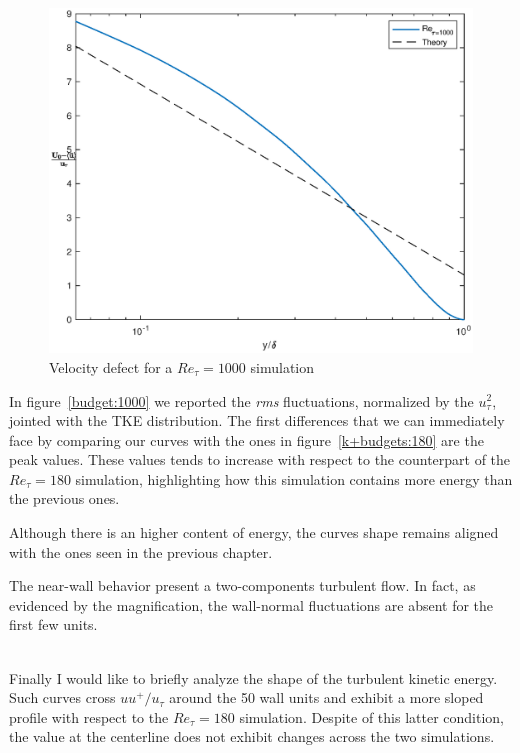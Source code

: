 \begin{figure}
\begin{center}
\includegraphics[scale=0.55]{grafici/velocity_defect_1000.eps}
\caption{Velocity defect for a $Re_{\tau}=1000$ simulation}
\label{velocity:defect:1000}
\end{center} 
\end{figure}

In figure~\ref{budget:1000} we reported the \emph{rms} fluctuations, normalized by the $u_{\tau}^{2}$, jointed with the TKE distribution. The first differences that we can immediately face by comparing our curves with the ones in figure~\ref{k+budgets:180} are the peak values. These values tends to increase with respect to the counterpart of the $Re_{\tau}=180$ simulation, highlighting how this simulation contains more energy than the previous ones.\par
Although there is an higher content of energy, the curves shape remains aligned with the ones seen in the previous chapter.\par
The near-wall behavior present a two-components turbulent flow. In fact, as evidenced by the magnification, the wall-normal fluctuations are absent for the first few units.
\\~\par

Finally I would like to briefly analyze the shape of the turbulent kinetic energy. Such curves cross $uu^{+}/u_{\tau}$ around the 50 wall units and exhibit a more sloped profile with respect to the $Re_{\tau}=180$ simulation. Despite of this latter condition, the value at the centerline does not exhibit changes across the two simulations.\\~\par

